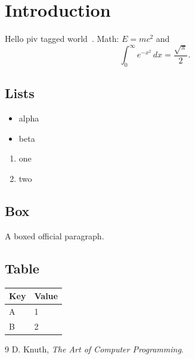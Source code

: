 \documentclass[12pt,letterpaper]{article}
\begin{document}
\linenumbers
\section{Introduction}
Hello \gls{piv} tagged world~\cite{knuth}. Math: $E = mc^2$ and
\begin{equation}
  \int_0^\infty e^{-x^2}\,dx = \frac{\sqrt{\pi}}{2}.
\end{equation}
\subsection{Lists}
\begin{itemize}[nosep]
  \item alpha
  \item beta
\end{itemize}
\begin{enumerate}
  \item one
  \item two
\end{enumerate}
\subsection{Box}
\begin{tcolorbox}[sharp corners, colback=gray!12.5]
A boxed official paragraph.
\end{tcolorbox}
\subsection{Table}
\begin{longtable}{ll}
\toprule Key & Value \\ \midrule
A & 1 \\
B & 2 \\ \bottomrule
\end{longtable}
\printglossary[type=\acronymtype]
\begin{thebibliography}{9}
 D. Knuth, \emph{The Art of Computer Programming}.
\end{thebibliography}
\end{document}
